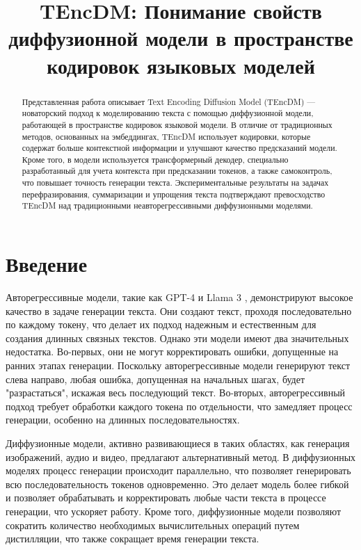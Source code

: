 \documentclass[a4paper, 12pt]{article}
\title{TEncDM: Понимание свойств диффузионной модели в пространстве кодировок языковых моделей}
\author{}
\date{}
\begin{document}
\maketitle

\begin{abstract}
Представленная работа описывает Text Encoding Diffusion Model (TEncDM) — новаторский подход к моделированию текста с помощью диффузионной модели, работающей в пространстве кодировок языковой модели. В отличие от традиционных методов, основанных на эмбеддингах, TEncDM использует кодировки, которые содержат больше контекстной информации и улучшают качество предсказаний модели. Кроме того, в модели используется трансформерный декодер, специально разработанный для учета контекста при предсказании токенов, а также самоконтроль, что повышает точность генерации текста. Экспериментальные результаты на задачах перефразирования, суммаризации и упрощения текста подтверждают превосходство TEncDM над традиционными неавторегрессивными диффузионными моделями.
\end{abstract}

\section{Введение}
Авторегрессивные модели, такие как GPT-4 \cite{gpt4} и Llama 3 \cite{llama3}, демонстрируют высокое качество в задаче генерации текста. Они создают текст, проходя последовательно по каждому токену, что делает их подход надежным и естественным для создания длинных связных текстов. Однако эти модели имеют два значительных недостатка. Во-первых, они не могут корректировать ошибки, допущенные на ранних этапах генерации. Поскольку авторегрессивные модели генерируют текст слева направо, любая ошибка, допущенная на начальных шагах, будет "разрастаться", искажая весь последующий текст. Во-вторых, авторегрессивный подход требует обработки каждого токена по отдельности, что замедляет процесс генерации, особенно на длинных последовательностях.

Диффузионные модели, активно развивающиеся в таких областях, как генерация изображений, аудио и видео, предлагают альтернативный метод. В диффузионных моделях процесс генерации происходит параллельно, что позволяет генерировать всю последовательность токенов одновременно. Это делает модель более гибкой и позволяет обрабатывать и корректировать любые части текста в процессе генерации, что ускоряет работу. Кроме того, диффузионные модели позволяют сократить количество необходимых вычислительных операций путем дистилляции, что также сокращает время генерации текста.
\end{document}
